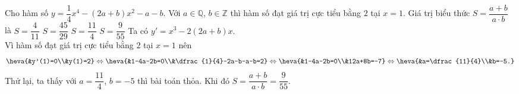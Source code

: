 \begin{ex}%
Cho hàm số $y=\dfrac{1}{4} x^4-(2 a+b) x^2-a-b$. Với $a \in \mathbb{Q}$, $b \in \mathbb{Z}$ thì hàm số đạt giá trị cực tiểu bằng $2$ tại $x=1$. Giá trị biểu thức $S=\dfrac{a+b}{a \cdot b}$ là
	\choice
	{$S=\dfrac{4}{11}$}
	{$S=\dfrac{45}{29}$}
	{$S=\dfrac{11}{4}$}
	{\True $S=\dfrac{9}{55}$}
	\loigiai
	{Ta có $y'=x^3-2(2a+b)x$.\\
Vì hàm số đạt giá trị cực tiểu bằng $2$ tại $x=1$ nên
\[\heva{&y'(1)=0\\&y(1)=2}\Leftrightarrow\heva{&1-4a-2b=0\\&\dfrac{1}{4}-2a-b-a-b=2}\Leftrightarrow \heva{&1-4a-2b=0\\&12a+8b=-7}\Leftrightarrow\heva{&a=\dfrac{11}{4}\\&b=-5.}\]	Thử lại, ta thấy với $a=\dfrac{11}{4}$, $b=-5$ thì bài toán thỏa. Khi đó $S=\dfrac{a+b}{a \cdot b}=\dfrac{9}{55}$.}
\end{ex}

